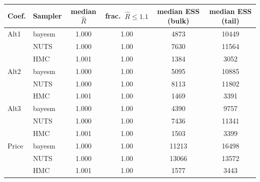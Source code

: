 \begin{tabular}{llcccc}
\toprule
Coef. & Sampler & median $\widehat{R}$ & frac.\ $\widehat{R}\leq1.1$ & median ESS (bulk) & median ESS (tail) \\
\midrule
Alt1 & bayesm & 1.000 & 1.00 & 4873 & 10449 \\
 & NUTS & 1.000 & 1.00 & 7630 & 11564 \\
 & HMC & 1.001 & 1.00 & 1384 & 3052 \\
Alt2 & bayesm & 1.000 & 1.00 & 5095 & 10885 \\
 & NUTS & 1.000 & 1.00 & 8113 & 11802 \\
 & HMC & 1.001 & 1.00 & 1469 & 3391 \\
Alt3 & bayesm & 1.000 & 1.00 & 4390 & 9757 \\
 & NUTS & 1.000 & 1.00 & 7436 & 11341 \\
 & HMC & 1.001 & 1.00 & 1503 & 3399 \\
Price & bayesm & 1.000 & 1.00 & 11213 & 16498 \\
 & NUTS & 1.000 & 1.00 & 13066 & 13572 \\
 & HMC & 1.001 & 1.00 & 1577 & 3443 \\
\bottomrule
\end{tabular}
